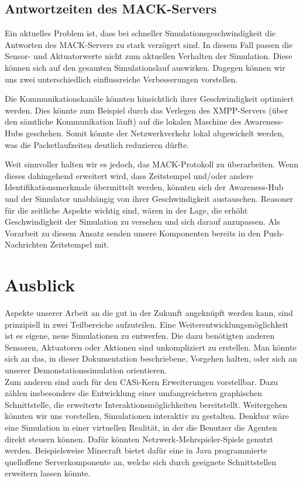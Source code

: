 \subsection{Antwortzeiten des MACK-Servers}\label{subsec:conc_open_questions_mack}
Ein aktuelles Problem ist, dass bei schneller Simulationsgeschwindigkeit die Antworten des MACK-Servers zu stark verzögert sind. In diesem Fall passen die Sensor- und Aktuatorwerte nicht zum aktuellen Verhalten der Simulation. Diese können sich auf den gesamten Simulationslauf auswirken. Dagegen können wir uns zwei unterschiedlich einflussreiche Verbesserungen vorstellen. 

Die Kommunikationskanäle könnten hinsichtlich ihrer Geschwindigkeit optimiert werden. Dies könnte zum Beispiel durch das Verlegen des XMPP-Servers (über den sämtliche Kommunikation läuft) auf die lokalen Maschine des Awareness-Hubs geschehen. Somit könnte der Netzwerkverkehr lokal abgewickelt werden, was die Packetlaufzeiten deutlich reduzieren dürfte.

Weit sinnvoller halten wir es jedoch, das MACK-Protokoll zu überarbeiten. Wenn dieses dahingehend erweitert wird, dass Zeitstempel und/oder andere Identifikationsmerkmale übermittelt werden, könnten sich der Awareness-Hub und der Simulator unabhängig von ihrer Geschwindigkeit austauschen. Reasoner für die zeitliche Aspekte wichtig sind, wären in der Lage, die erhöht Geschwindigkeit der Simulation zu versehen und sich darauf anzupassen. Als Vorarbeit zu diesem Ansatz senden unsere Komponenten bereits in den Push-Nachrichten Zeitstempel mit.

\section{Ausblick}\label{sec:conc_outlook}
Aspekte unserer Arbeit an die gut in der Zukunft angeknüpft werden kann, sind prinzipiell in zwei Teilbereiche aufzuteilen. Eine Weiterentwicklungsmöglichkeit ist es eigene, neue Simulationen zu entwerfen. Die dazu benötigten anderen Sensoren, Aktuatoren oder Aktionen sind unkompliziert zu erstellen. Man könnte sich an das, in dieser Dokumentation beschriebene, Vorgehen halten, oder sich an unserer Demonstations\-simulation orientieren.\\

Zum anderen sind auch für den CASi-Kern Erweiterungen vorstellbar. Dazu zählen insbesondere die Entwicklung einer umfangreicheren graphischen Schnittstelle, die erweiterte Interaktionsmöglichkeiten bereitstellt. Weitergehen könnten wir uns vorstellen, Simulationen interaktiv zu gestalten. Denkbar wäre  eine Simulation in einer virtuellen Realität, in der die Benutzer die Agenten direkt steuern können. Dafür könnten Netzwerk-Mehrspieler-Spiele genutzt werden. Beispielsweise Minecraft \cite{web-minecraft} bietet dafür eine in Java programmierte quelloffene Serverkomponente an, welche sich durch geeignete Schnittstellen erweitern lassen könnte.
